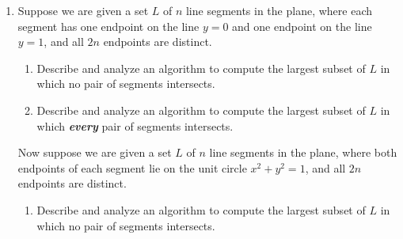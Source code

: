 \begin{enumerate}[label=\arabic*.,ref=\thechapter.\arabic*,leftmargin=*,align=left,widest*=99,itemsep=1.5ex plus 0.5ex]
\begin{itemize}
\item Play the word  for 16 points, leaving  in hand.
\item Play the word  for 9 points, emptying our hand and ending the
game.
\end{itemize}
\begin{enumerate}
\item Suppose the sequence of tiles is represented by two arrays $\Var{Letter}[1\,..\,n]$, containing a sequence of letters between  and , and $\Var{Value}[$ $..$ $]$, where $\Var{Value}[\ell ]$ is the value of any tile with letter $\ell$.
Design and analyze an efficient algorithm to compute the maximum number of points that can be earned from the given sequence of tiles.
\item Now suppose two tiles with the same letter might have different values.
Now the tile sequence is represented by two arrays $\Var{Letter}[1\,..\,n]$ and $\Var{Value}[1\,..\,n]$, where $\Var{Value}[i]$ is the value of the $i$th tile.
Design and analyze an efficient algorithm to compute the maximum number of points that can be earned from the given sequence of tiles.
In both problems, the output is a single number: the maximum possible score.
Assume (because it’s true) that you can find all English words that can be made from any set of at most seven tiles, along with the point values of those words, in $O(1)$ time.
\end{enumerate}
\item Suppose we are given a set $L$ of $n$ line segments in the plane, where each segment has one endpoint on the line $y=0$ and one endpoint on the line $y=1$, and all $2n$ endpoints are distinct.
\begin{enumerate}
\item Describe and analyze an algorithm to compute the largest subset of $L$ in which no pair of segments intersects.
\item Describe and analyze an algorithm to compute the largest subset of $L$ in which \textbf{\textit{every}} pair of segments intersects.
\end{enumerate}
Now suppose we are given a set $L$ of $n$ line segments in the plane, where both endpoints of each segment lie on the unit circle $x^2+y^2=1$, and all $2n$ endpoints are distinct.
\begin{enumerate}[resume]
\item Describe and analyze an algorithm to compute the largest subset of $L$ in which no pair of segments intersects.

\end{enumerate}
\end{enumerate}
